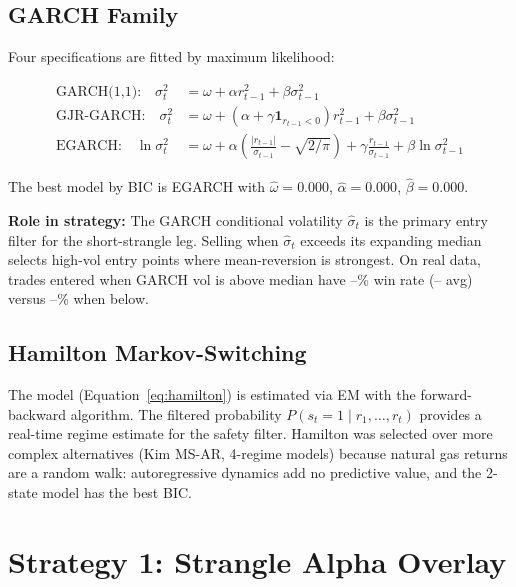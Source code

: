 \documentclass[11pt,a4paper]{article}
\begin{document}
\subsection{GARCH Family}

Four specifications are fitted by maximum likelihood:

\begin{align}
\text{GARCH(1,1):} \quad \sigma_t^2 &= \omega + \alpha r_{t-1}^2 + \beta \sigma_{t-1}^2 \label{eq:garch} \\
\text{GJR-GARCH:} \quad \sigma_t^2 &= \omega + (\alpha + \gamma \mathbf{1}_{r_{t-1}<0}) r_{t-1}^2 + \beta \sigma_{t-1}^2 \label{eq:gjr} \\
\text{EGARCH:} \quad \ln \sigma_t^2 &= \omega + \alpha \left(\frac{|r_{t-1}|}{\sigma_{t-1}} - \sqrt{2/\pi}\right) + \gamma \frac{r_{t-1}}{\sigma_{t-1}} + \beta \ln \sigma_{t-1}^2 \label{eq:egarch}
\end{align}

The best model by BIC is EGARCH with $\hat{\omega} = 0.000$, $\hat{\alpha} = 0.000$, $\hat{\beta} = 0.000$.

\textbf{Role in strategy:} The GARCH conditional volatility $\hat{\sigma}_t$ is the primary entry filter for the short-strangle leg. Selling when $\hat{\sigma}_t$ exceeds its expanding median selects high-vol entry points where mean-reversion is strongest. On real data, trades entered when GARCH vol is above median have --\% win rate (-- avg) versus --\% when below.

\subsection{Hamilton Markov-Switching}

The model (Equation~\ref{eq:hamilton}) is estimated via EM with the forward-backward algorithm. The filtered probability $P(s_t = 1 \mid r_1, \ldots, r_t)$ provides a real-time regime estimate for the safety filter. Hamilton was selected over more complex alternatives (Kim MS-AR, 4-regime models) because natural gas returns are a random walk: autoregressive dynamics add no predictive value, and the 2-state model has the best BIC.


\section{Strategy 1: Strangle Alpha Overlay}
\label{sec:strat1}
\end{document}
